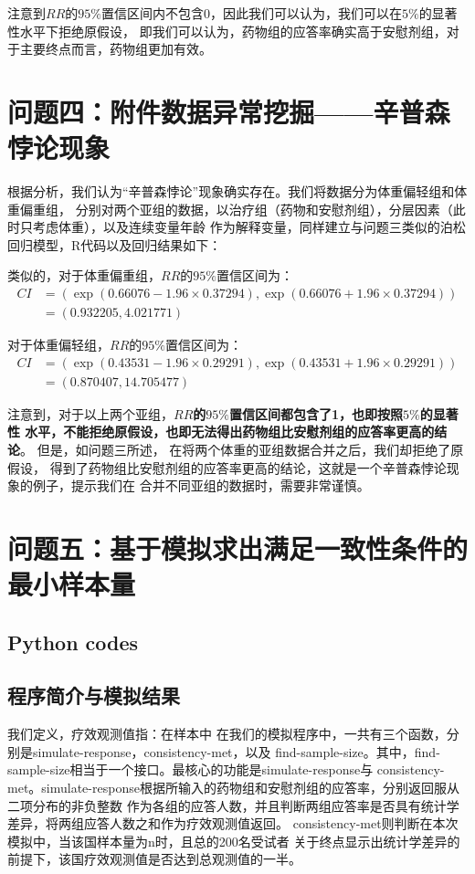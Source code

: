 \documentclass{article}
\begin{document}
注意到$RR$的$95\%$置信区间内不包含0，因此我们可以认为，我们可以在$5\%$的显著性水平下拒绝原假设，
即我们可以认为，药物组的应答率确实高于安慰剂组，对于主要终点而言，药物组更加有效。


\section{问题四：附件数据异常挖掘——辛普森悖论现象}

根据分析，我们认为“辛普森悖论”现象确实存在。我们将数据分为体重偏轻组和体重偏重组，
分别对两个亚组的数据，以治疗组（药物和安慰剂组），分层因素（此时只考虑体重），以及连续变量年龄
作为解释变量，同样建立与问题三类似的泊松回归模型，R代码以及回归结果如下：


类似的，对于体重偏重组，$RR$的$95\%$置信区间为：
\begin{align*}
CI &= (\exp(0.66076-1.96\times0.37294), \exp(0.66076+1.96\times0.37294))\\
& = (0.932205,4.021771)
\end{align*}

对于体重偏轻组，$RR$的$95\%$置信区间为：
\begin{align*}
CI &= (\exp(0.43531-1.96\times0.29291), \exp(0.43531+1.96\times0.29291))\\
& = (0.870407,14.705477)
\end{align*}

注意到，对于以上两个亚组，\textbf{$RR$的$95\%$置信区间都包含了1，也即按照$5\%$的显著性
水平，不能拒绝原假设，也即无法得出药物组比安慰剂组的应答率更高的结论}。 但是，如问题三所述，
在将两个体重的亚组数据合并之后，我们却拒绝了原假设，
得到了药物组比安慰剂组的应答率更高的结论，这就是一个辛普森悖论现象的例子，提示我们在
合并不同亚组的数据时，需要非常谨慎。


\section{问题五：基于模拟求出满足一致性条件的最小样本量}
\subsection{Python codes}

\subsection{程序简介与模拟结果}
我们定义，疗效观测值指：在样本中
在我们的模拟程序中，一共有三个函数，分别是simulate-response，consistency-met，以及
find-sample-size。其中，find-sample-size相当于一个接口。最核心的功能是simulate-response与
consistency-met。simulate-response根据所输入的药物组和安慰剂组的应答率，分别返回服从二项分布的非负整数
作为各组的应答人数，并且判断两组应答率是否具有统计学差异，将两组应答人数之和作为疗效观测值返回。
consistency-met则判断在本次模拟中，当该国样本量为n时，且总的200名受试者
关于终点显示出统计学差异的前提下，该国疗效观测值是否达到总观测值的一半。
\end{document}
